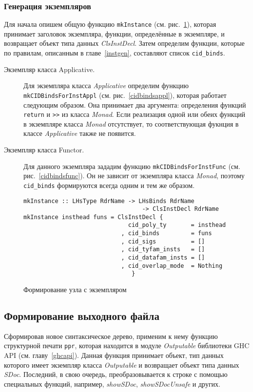 \subsubsection{Генерация экземпляров}
Для начала опишем общую функцию \lstinline{mkInstance} (см. рис.~\ref{mkinst}), которая принимает заголовок экземпляра, функции, определённые в экземпляре, и возвращает объект типа данных \textit{ClsInstDecl}.
Затем определим функции, которые по правилам, описанным в главе~\ref{instgen}, составляют список \lstinline{cid_binds}.
\begin{description}
\item[Экземпляр класса Applicative.] Для экземпляра класса \textit{Applicative} определим функцию \lstinline{mkCIDBindsForInstAppl} (см. рис.~\ref{cidbindsappl}), которая работает следующим образом. Она принимает два аргумента: определения функций \lstinline{return} и \lstinline{>>} из класса \textit{Monad}. Если реализация одной или обеих функций в экземпляре класса \textit{Monad} отсутствует, то соответствующая фукнция в классе \textit{Applicative} также не появится.
\item[Экземпляр класса Functor.] Для данного экземпляра зададим функцию \lstinline{mkCIDBindsForInstFunc} (см. рис.~\ref{cidbindsfunc}). Он не зависит от экземпляра класса \textit{Monad}, поэтому \lstinline{cid_binds} формируются всегда одним и тем же образом.
\end{description}

\begin{figure}[h]
\hrulefill
\begin{lstlisting}
mkInstance :: LHsType RdrName -> LHsBinds RdrName
                                  -> ClsInstDecl RdrName
mkInstance insthead funs = ClsInstDecl { 
                              cid_poly_ty       = insthead
                            , cid_binds         = funs
                            , cid_sigs          = []
                            , cid_tyfam_insts   = []
                            , cid_datafam_insts = []
                            , cid_overlap_mode  = Nothing
                               }
\end{lstlisting}
\hrulefill
\caption{Формирование узла с экземпляром}\label{mkinst}
\end{figure}

\subsection{Формирование выходного файла}
Сформировав новое синтаксическое дерево, применим к нему функцию структурной печати \lstinline{ppr}, которая находится в модуле \textit{Outputable} библиотеки GHC API (см. главу~\ref{ghcapi}). Данная функция принимает объект, тип данных которого имеет экземпляр класса \textit{Outputable} и возвращает объект типа данных \textit{SDoc}. Последний, в свою очередь, преобразовывается к строке с помощью специальных функций, например, \textit{showSDoc}, \textit{showSDocUnsafe} и других.

